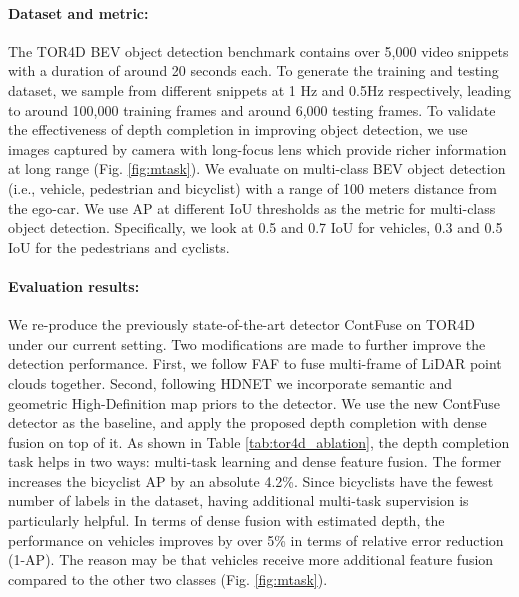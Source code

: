 \documentclass[10pt,twocolumn,letterpaper]{article}
\begin{document}
\paragraph{Dataset and metric:}
The TOR4D BEV object detection benchmark \cite{pixor} contains over 5,000 video snippets with a duration of around 20 seconds each. To generate the training and testing dataset, we  sample from different snippets at 1 Hz and 0.5Hz respectively, leading to around 100,000 training frames and around 6,000 testing frames. To validate the effectiveness of depth completion in improving object detection, we use images captured by camera with long-focus lens which provide richer information at long range (Fig. \ref{fig:mtask}). We evaluate on multi-class BEV object detection (i.e., vehicle, pedestrian and bicyclist) with a range of 100 meters distance from the ego-car. We use AP at different IoU thresholds as the metric for multi-class object detection. Specifically, we look at 0.5 and 0.7 IoU for vehicles, 0.3 and 0.5 IoU for the pedestrians and cyclists.


\paragraph{Evaluation results:}
We re-produce the previously state-of-the-art detector ContFuse \cite{contfuse} on TOR4D under our current setting. Two modifications are made to further improve the detection performance. First, we follow FAF \cite{dpt} to fuse multi-frame of LiDAR point clouds together. Second, following HDNET \cite{hdnet} we incorporate semantic and geometric High-Definition map priors to the detector. We use the new ContFuse detector as the baseline, and apply the proposed depth completion with dense fusion on top of it. As shown in Table \ref{tab:tor4d_ablation}, the depth completion task helps in two ways: multi-task learning and dense feature fusion. The former increases the bicyclist AP by an absolute 4.2\%. Since bicyclists have the fewest number of labels in the dataset, having additional multi-task supervision is particularly helpful. In terms of dense fusion with estimated depth, the performance on vehicles improves by over 5\% in terms of relative error reduction (1-AP).
The reason may be that vehicles receive more additional feature fusion compared to the other two classes (Fig. \ref{fig:mtask}).
\end{document}
